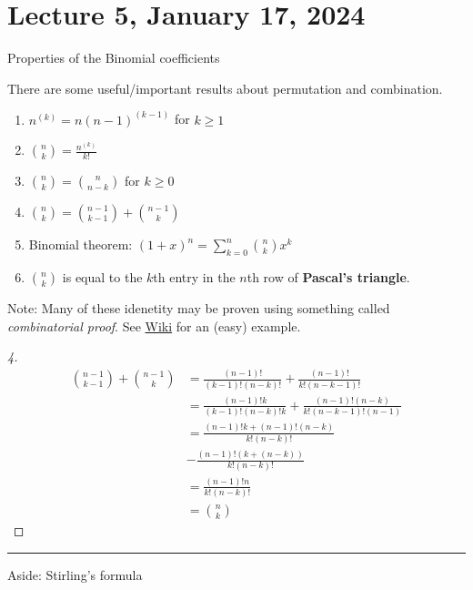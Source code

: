 \documentclass[
]{book}
\providecommand{\tightlist}{%
  \setlength{\itemsep}{0pt}\setlength{\parskip}{0pt}}
\theoremstyle{definition}
\theoremstyle{definition}
\theoremstyle{definition}
\theoremstyle{definition}
\theoremstyle{remark}
\begin{document}
\hypertarget{lecture-5-january-17-2024}{%
\chapter{Lecture 5, January 17, 2024}\label{lecture-5-january-17-2024}}

Properties of the Binomial coefficients

There are some useful/important results about permutation and combination.

\begin{enumerate}
\def\labelenumi{\arabic{enumi}.}
\tightlist
\item
  \(n^{(k)} = n (n - 1)^{(k-1)}\) for \(k \geq 1\)
\item
  \({n \choose k} = \frac{n^{(k)}}{k!}\)
\item
  \({n \choose k} = {n \choose n-k}\) for \(k \geq 0\)
\item
  \({n \choose k} = {n-1 \choose k-1} + {n-1 \choose k}\)
\item
  Binomial theorem: \((1 + x)^n = \sum_{k=0}^n {n \choose k} x^k\)
\item
  \({n \choose k}\) is equal to the \(k\)th entry in the \(n\)th row of \textbf{Pascal's triangle}.
\end{enumerate}

Note: Many of these idenetity may be proven using something called \emph{combinatorial proof}. See \href{https://en.wikipedia.org/wiki/Combinatorial_proof}{Wiki} for an (easy) example.

\begin{proof}[4]
\begin{align*}
{n-1 \choose k-1} + {n-1 \choose k} &= \frac{(n-1)!}{(k-1)! (n-k)!} + \frac{(n-1)!}{k! (n-k-1)!}\\
&= \frac{(n-1)!k }{(k-1)! (n-k)!k} + \frac{(n-1)!(n-k)}{k! (n-k-1)!(n-1)} \\
&= \frac{(n-1)!k + (n-1)! (n-k)}{k! (n-k)!} \\
&- \frac{(n-1)!( k + (n-k))}{k! (n-k)!} \\
&= \frac{(n-1)! n}{k! (n-k)!} \\
&= {n \choose k}
\end{align*}
\end{proof}

\begin{center}\rule{0.5\linewidth}{0.5pt}\end{center}

Aside: Stirling's formula
\end{document}
